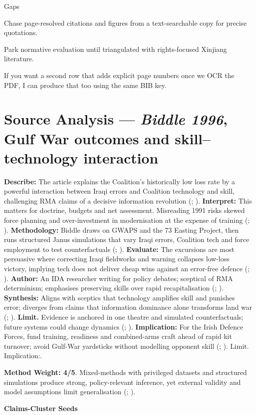Gaps

Chase page-resolved citations and figures from a text-searchable copy for precise quotations.

Park normative evaluation until triangulated with rights-focused Xinjiang literature.

If you want a second row that adds explicit page numbers once we OCR the PDF, I can produce that too using the same BIB key.

\parencite{BIDDLE_1996}

\section*{Source Analysis — \textit{Biddle 1996}, Gulf War outcomes and skill–technology interaction}
\textbf{Describe:} The article explains the Coalition’s historically low loss rate by a powerful interaction between Iraqi errors and Coalition technology and skill, challenging RMA claims of a decisive information revolution (; ).
\textbf{Interpret:} This matters for doctrine, budgets and net assessment. Misreading 1991 risks skewed force planning and over-investment in modernisation at the expense of training (; ).
\textbf{Methodology:} Biddle draws on GWAPS and the 73 Easting Project, then runs structured Janus simulations that vary Iraqi errors, Coalition tech and force employment to test counterfactuals (; ).
\textbf{Evaluate:} The excursions are most persuasive where correcting Iraqi fieldworks and warning collapses low-loss victory, implying tech does not deliver cheap wins against an error-free defence (; ).
\textbf{Author:} An IDA researcher writing for policy debates; sceptical of RMA determinism; emphasises preserving skills over rapid recapitalisation (; ).
\textbf{Synthesis:} Aligns with sceptics that technology amplifies skill and punishes error; diverges from claims that information dominance alone transforms land war (; ).
\textbf{Limit.} Evidence is anchored in one theatre and simulated counterfactuals; future systems could change dynamics (; ).
\textbf{Implication:} For the Irish Defence Forces, fund training, readiness and combined-arms craft ahead of rapid kit turnover; avoid Gulf-War yardsticks without modelling opponent skill (; ). Limit. Implication:.

\textbf{Method Weight: 4/5}. Mixed-methods with privileged datasets and structured simulations produce strong, policy-relevant inference, yet external validity and model assumptions limit generalisation (; ).

\textbf{Claims-Cluster Seeds}

